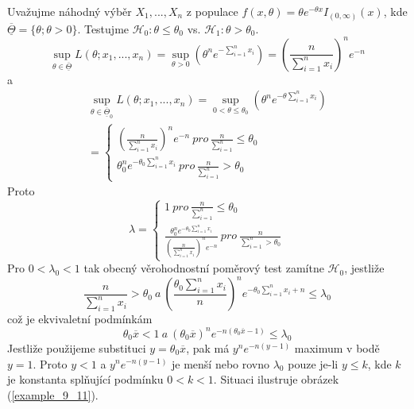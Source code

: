 \begin{example}
Uvažujme náhodný výběr $X_1, ..., X_n$ z populace $f(x, \theta) = \theta e^{-\theta x}I_{(0, \infty)}(x)$, kde $\overline{\underline{\Theta}} = \{\theta; \theta > 0\}$. Testujme  $\mathscr{H}_0: \theta \le \theta_0$ vs. $\mathscr{H}_1: \theta > \theta_0$.
\begin{equation*}
\sup_{\theta \in \overline{\underline{\Theta}}} L(\theta; x_1, ..., x_n) = \sup_{\theta > 0}\left(\theta^n e^{-\sum_{i = 1}^n x_i}\right) = \left(\frac{n}{\sum_{i = 1}^n x_i}\right)^n e^{-n}
\end{equation*}
a
\begin{multline*}
\sup_{\theta \in \overline{\underline{\Theta}}_0} L(\theta; x_1, ..., x_n) = \sup_{0 < \theta \le \theta_0}(\theta^n e^{-\theta \sum_{i = 1}^n x_i})\\
=
\begin{cases}
\left(\frac{n}{\sum_{i = 1}^n x_i}\right)^n e^{-n} ~ \textit{pro} ~ \frac{n}{\sum_{i = 1}^n} \le \theta_0\\
\theta_0^n e^{-\theta_0 \sum_{i = 1}^n x_i} ~ \textit{pro} ~ \frac{n}{\sum_{i = 1}^n} > \theta_0
\end{cases}
\end{multline*}
Proto
\begin{equation*}
\lambda =
\begin{cases}
1 ~ \textit{pro} ~ \frac{n}{\sum_{i = 1}^n} \le \theta_0\\
\frac{\theta_0^n e^{-\theta_0 \sum_{i = 1}^n x_i}}{\left(\frac{n}{\sum_{i = 1}^n x_i}\right)^n e^{-n}} ~ \textit{pro} ~ \frac{n}{\sum_{i = 1}^n > \theta_0}
\end{cases}
\end{equation*}
Pro $0 < \lambda_0 < 1$ tak obecný věrohodnostní poměrový test zamítne $\mathscr{H}_0$, jestliže
\begin{equation*}
\frac{n}{\sum_{i = 1}^n x_i} > \theta_0 ~ \textit{a} ~ \left(\frac{\theta_0 \sum_{i = 1}^n x_i}{n}\right)^n e^{-\theta_0 \sum_{i = 1}^n x_i + n} \le \lambda_0
\end{equation*}
což je ekvivaletní podmínkám
\begin{equation*}
\theta_0 \overline{x} < 1 ~ \textit{a} ~ (\theta_0 \overline{x})^n e^{-n(\theta_0 \overline{x} - 1)} \le \lambda_0
\end{equation*}
Jestliže použijeme substituci $y = \theta_0 \overline{x}$, pak má $y^ne^{-n(y - 1)}$ maximum v bodě $y = 1$. Proto $y < 1$ a $y^n e^{-n(y - 1)}$ je menší nebo rovno $\lambda_0$ pouze je-li $y \le k$, kde $k$ je konstanta splňující podmínku $0 < k < 1$. Situaci ilustruje obrázek (\ref{example_9_11}).


\end{example}
